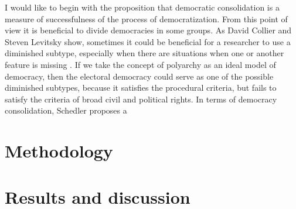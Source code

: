 \documentclass[a4paper, 12pt]{article}
\begin{document}
I would like to begin with the proposition that democratic consolidation is a measure of successfulness of the process of democratization. From this point of view it is beneficial to divide democracies in some groups. As David Collier and Steven Levitsky show, sometimes it could be beneficial for a researcher to use a diminished subtype, especially when there are situations when one or another feature is missing \parencite{collier_democracy_1997}. If we take the concept of polyarchy as an ideal model of democracy, then the electoral democracy could serve as one of the possible diminished subtypes, because it satisfies the procedural criteria, but fails to satisfy the criteria of broad civil and political rights. In terms of democracy consolidation, Schedler proposes a 


\section*{Methodology}


\section*{Results and discussion}

\printbibliography
\end{document}
